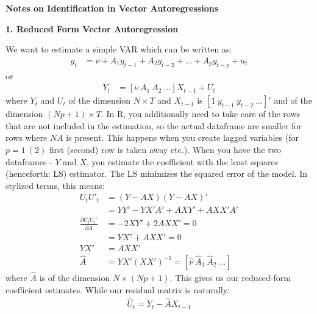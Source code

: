 \documentclass[a4paper, 12pt]{article}
\begin{document}
\begin{center}
\large\bfseries{Notes on Identification in Vector Autoregressions} 
\end{center}
\begin{center}
\textbf{1. Reduced Form Vector Autoregression}
\end{center}

\noindent We want to estimate a simple VAR which can be written as:
\begin{equation}
\begin{aligned}
y_{t} &=\nu+A_1 y_{t-1}+A_2 y_{t-2}+...+A_p y_{t-p}+u_t \nonumber
\end{aligned}
\end{equation}
or 
\begin{equation}
\begin{aligned}
Y_t &=[\nu \ A_1 \ A_2 \ ...]X_{t-1}+U_t \nonumber
\end{aligned}
\end{equation}
where $Y_t$ and $U_t$ of the dimension $N\times T$ and $X_{t-1}$ is $[1 \ y_{t-1} \ y_{t-2} \ ...]'$ and of the dimension $(Np+1)\times T$. In R, you additionally need to take care of the rows that are not included in the estimation, so the actual dataframe are smaller for rows where $NA$ is present. 
This happens when you create lagged variables (for $p=1 \ (2)$ first (second) row is taken away etc.). When you have the two dataframes - $Y$ and $X$, you estimate the coefficient with the least squares (henceforth: LS) estimator.  
The LS minimizes the squared error of the model. In stylized terms, this means:
\begin{equation}
\begin{aligned}
U_tU'_t&=(Y-AX)(Y-AX)' \nonumber \\
&= YY'-YX'A'+AXY' + AXX'A' \nonumber \\
\frac{\partial U_tU_t'}{ \partial A} &= -2XY'+2AXX'=0\\
&=YX'+AXX'=0 \\
YX'&=AXX' \\
\hat{A}&=YX'(XX')^{-1}=[\hat{\nu} \ \hat{A}_1 \ \hat{A}_2 \ ...]
\end{aligned}
\end{equation}
where $\hat{A}$ is of the dimension $N\times(Np+1)$. This gives us our reduced-form coefficient estimates. While our residual matrix is naturally:
\begin{equation}
\begin{aligned}
\hat{U}_t=Y_t-\hat{A}X_{t-1} \nonumber
\end{aligned}
\end{equation}
\end{document}
